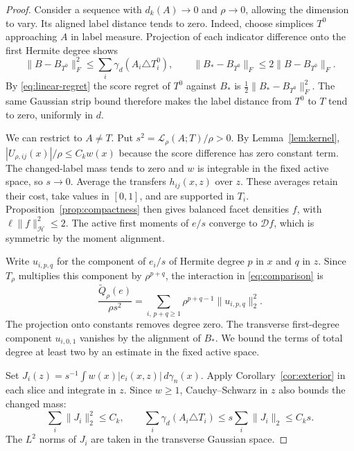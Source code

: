 \documentclass[11pt,reqno]{amsart}
\newcommand{\norm}[1]{\lVert #1\rVert}
\newcommand{\ga}{\gamma}
\newcommand{\LL}{\mathcal L}
\newcommand{\HH}{\mathcal H}
\newcommand{\DD}{\mathcal D}
\begin{document}
\begin{proof}
Consider a sequence with $d_k(A)\to0$ and $\rho\to0$, allowing the
dimension to vary. Its aligned label distance tends to zero. Indeed,
choose simplices $T^0$ approaching $A$ in label measure. Projection of
each indicator difference onto the first Hermite degree shows
\[
 \norm{B-B_{T^0}}_F^2\le\sum_i\ga_d(A_i\triangle T_i^0),\qquad
 \norm{B_*-B_{T^0}}_F\le 2\norm{B-B_{T^0}}_F .
\]
By \eqref{eq:linear-regret} the score regret of $T^0$ against $B_*$
is $\tfrac12\norm{B_*-B_{T^0}}_F^2$. The same Gaussian strip bound
therefore makes the label distance from $T^0$ to $T$ tend to zero,
uniformly in $d$.

We can restrict to $A\ne T$. Put $s^2=\LL_\rho(A;T)/\rho>0$.
By Lemma~\ref{lem:kernel}, $|U_{\rho,ij}(x)|/\rho\le C_k w(x)$
because the score difference has zero constant term. The changed-label
mass tends to zero and $w$ is integrable in the fixed active space,
so $s\to0$. Average the transfers $h_{ij}(x,z)$ over $z$. These
averages retain their cost, take values in $[0,1]$, and are supported
in $T_i$. Proposition~\ref{prop:compactness} then gives balanced facet
densities $f$, with $\ell\norm f_\HH^2\le2$. The active first moments
of $e/s$ converge to $\DD f$, which is symmetric by the moment
alignment.

Write $u_{i,p,q}$ for the component of $e_i/s$ of Hermite degree
$p$ in $x$ and $q$ in $z$. Since $T_\rho$ multiplies this component by
$\rho^{p+q}$, the interaction in \eqref{eq:comparison} is
\[
 \frac{\widetilde Q_\rho(e)}{\rho s^2}
   =\sum_{i,\,p+q\ge1}\rho^{p+q-1}\norm{u_{i,p,q}}_2^2 .
\]
The projection onto constants removes degree zero. The transverse
first-degree component $u_{i,0,1}$ vanishes by the alignment of $B_*$.
We bound the terms of total degree at least two by an estimate in the
fixed active space.

Set $J_i(z)=s^{-1}\int w(x)|e_i(x,z)|\,d\ga_n(x)$.
Apply Corollary~\ref{cor:exterior} in each slice and integrate in $z$.
Since $w\ge1$, Cauchy--Schwarz in $z$ also bounds the changed mass:
\begin{equation}\label{eq:distance-cost}
 \sum_i\norm{J_i}_2^2\le C_k,\qquad
 \sum_i\ga_d(A_i\triangle T_i)\le s\sum_i\norm{J_i}_2\le C_k s.
\end{equation}
The $L^2$ norms of $J_i$ are taken in the transverse Gaussian space.


\end{proof}
\end{document}

